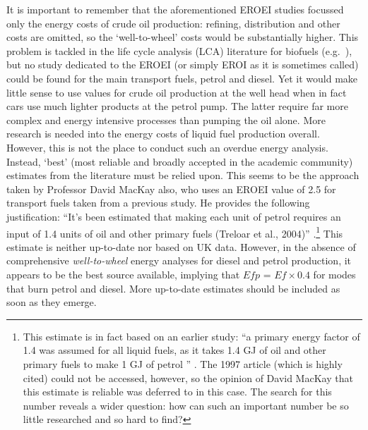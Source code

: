 It is important to
remember that the aforementioned EROEI studies focussed only the energy costs
of crude oil production: refining, distribution and
other costs are omitted, so the `well-to-wheel' costs would be substantially
higher. This problem is tackled in the life cycle analysis (LCA) literature
for biofuels (e.g.~\citealp{cherubini2009energy}), but no study dedicated to the
EROEI (or simply EROI as it is sometimes called) could be found
for the main transport fuels, petrol and diesel. Yet it would make little sense
to use values for crude oil production at the well head when in fact cars use
much lighter products at the petrol pump. The latter require far more complex
and energy intensive processes than pumping the oil alone. More research is
needed into the energy costs of liquid fuel production overall. However, this
is not the place to conduct such an overdue energy analysis. Instead, 
`best' (most reliable and broadly accepted in the
academic community) estimates from the literature must be relied upon.
This seems to be the approach taken by Professor David
MacKay also, who uses an EROEI value of 2.5 for
transport fuels taken from a previous study. He provides the following
justification: ``It’s been estimated
that making each unit of petrol requires an input of 1.4 units of oil and
other primary fuels (Treloar et al., 2004)''
\citep[p.~30]{MacKay2009}.\footnote{This
estimate
is in fact based on an earlier study: ``a primary energy factor
of 1.4 was assumed for all liquid fuels, as it takes 1.4 GJ of oil
and other primary fuels to make 1 GJ of petrol \citep{Treloar1997}''
\citep[p.~46]{Treloar2004}. The 1997 article (which is highly cited)
could not be accessed, however, so the opinion of David MacKay that this
estimate is reliable was deferred to in this case. The search for this number
reveals a wider question: how can such an important number be so little
researched and so hard to find?
}
This estimate is neither up-to-date nor based on UK data. However, in the
absence of comprehensive \emph{well-to-wheel} energy analyses for diesel and
petrol production, it appears to be the best source available, implying that
$Efp$ = $Ef \times 0.4$ for modes that burn petrol and diesel. More up-to-date
estimates should be included as soon as they emerge.

